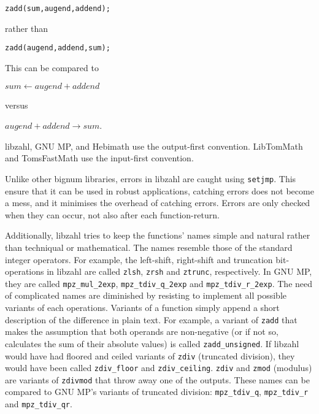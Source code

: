 \begin{alltt}
   zadd(sum, augend, addend);
\end{alltt}

\noindent
rather than

\begin{alltt}
   zadd(augend, addend, sum);
\end{alltt}

\noindent
This can be compared to

\vspace{1ex}
$sum \gets augend + addend$
\vspace{1ex}

\noindent
versus

\vspace{1ex}
$augend + addend \rightarrow sum$.
\vspace{1ex}

libzahl, GNU MP, and Hebimath use the output-first
convention. LibTomMath and TomsFastMath use the
input-first convention.

Unlike other bignum libraries, errors in libzahl are
caught using {\tt setjmp}. This ensure that it can be
used in robust applications, catching errors does not
become a mess, and it minimises the overhead of
catching errors. Errors are only checked when they can
occur, not also after each function-return.

Additionally, libzahl tries to keep the functions'
names simple and natural rather than techniqual or
mathematical. The names resemble those of the standard
integer operators. For example, the left-shift, right-shift
and truncation bit-operations in libzahl are called
{\tt zlsh}, {\tt zrsh} and {\tt ztrunc}, respectively.
In GNU MP, they are called {\tt mpz\_mul\_2exp},
{\tt mpz\_tdiv\_q\_2exp} and {\tt mpz\_tdiv\_r\_2exp}.
The need of complicated names are diminished by resisting
to implement all possible variants of each operations.
Variants of a function simply append a short description
of the difference in plain text. For example, a variant of
{\tt zadd} that makes the assumption that both operands
are non-negative (or if not so, calculates the sum of
their absolute values) is called {\tt zadd\_unsigned}.
If libzahl would have had floored and ceiled variants of
{\tt zdiv} (truncated division), they would have been
called {\tt zdiv\_floor} and {\tt zdiv\_ceiling}.
{\tt zdiv} and {\tt zmod} (modulus) are variants of
{\tt zdivmod} that throw away one of the outputs. These
names can be compared to GNU MP's variants of truncated
division: {\tt mpz\_tdiv\_q}, {\tt mpz\_tdiv\_r} and
{\tt mpz\_tdiv\_qr}.


